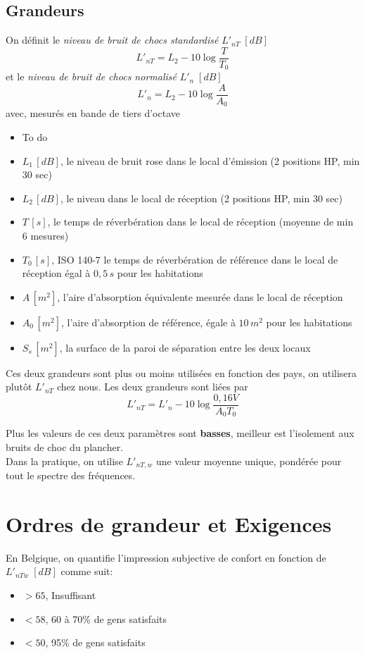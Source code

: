 \documentclass[11pt]{report}
\begin{document}
\subsection{Grandeurs}
On définit le \textit{niveau de bruit de chocs standardisé} $L'_{nT}\;[dB]$
$$L'_{nT} = L_2 - 10\log \frac{T}{T_0}$$
et le \textit{niveau de bruit de chocs normalisé} $L'_{n}\;[dB]$
$$L'_{n} = L_2 - 10\log \frac{A}{A_0}$$
avec, mesurés en bande de tiers d'octave
\begin{itemize}
\item To do
\item $L_1\,[dB]$, le niveau de bruit rose dans le local d'émission (2 positions HP, min 30 sec)
\item $L_2\,[dB]$, le niveau dans le local de réception (2 positions HP, min 30 sec)
\item $T\,[s]$, le temps de réverbération dans le local de réception (moyenne de min 6 mesures)
\item $T_0\,[s]$, ISO 140-7 le temps de réverbération de référence dans le local de réception égal à $0,5\,s$ pour les habitations
\item $A\,[m^2]$, l'aire d'absorption équivalente mesurée dans le local de réception
\item $A_0\,[m^2]$, l'aire d'absorption de référence, égale à $10\,m^2$ pour les habitations
\item $S_s\,[m^2]$, la surface de la paroi de séparation entre les deux locaux
\end{itemize}

Ces deux grandeurs sont plus ou moins utilisées en fonction des pays, on utilisera plutôt $L'_{nT}$ chez nous.  Les deux grandeurs sont liées par 
$$L'_{nT}=L'_{n}- 10 \log \frac{0,16 V}{A_0 T_0}$$

Plus les valeurs de ces deux paramètres sont \textbf{basses}, meilleur est l'isolement aux bruits de choc du plancher.\\

Dans la pratique, on utilise $L'_{nT,w}$ une valeur moyenne unique, pondérée  pour tout le spectre des fréquences. 


\section{Ordres de grandeur et Exigences}
\label{ordre}
En Belgique, on quantifie l'impression subjective de confort en fonction de $L'_{nTw}\; [dB]$ comme suit:

\begin{itemize}
\item $ > 65 $,  Insuffisant
\item $ < 58 $,  60 à 70\% de gens satisfaits 
\item $ < 50 $,  95\% de gens satisfaits
\end{itemize}
\end{document}
